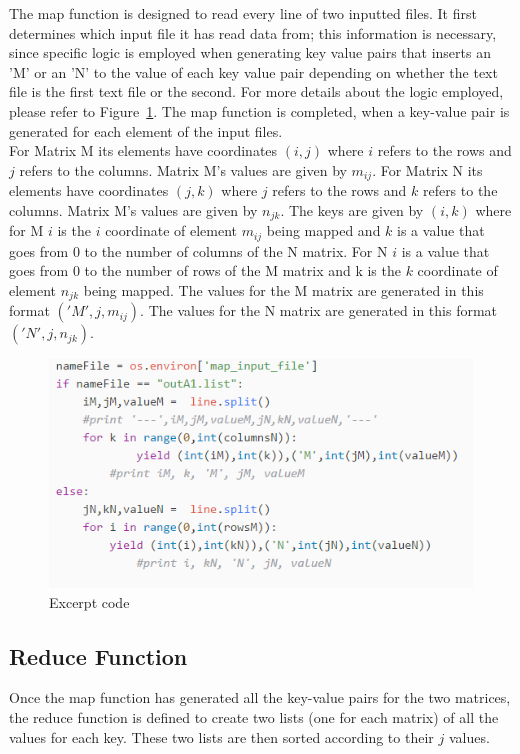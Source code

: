 \documentclass[journal, a4paper]{IEEEtran}
\begin{document}
The map function is designed to read every line of two inputted files. It first determines which input file it has read data from; this information is necessary, since specific logic is employed when generating key value pairs that inserts an 'M' or an 'N' to the value of each key value pair depending on whether the text file is the first text file or the second. For more details about the logic employed, please refer to Figure~\ref{code}. The map function is completed, when a key-value pair is generated for each element of the input files. \\

For Matrix M its elements have coordinates $(i,j)$ where $i$ refers to the rows and $j$ refers to the columns. Matrix M's values are given by $m_{ij}$. For Matrix N its elements have coordinates $(j,k)$ where $j$ refers to the rows and $k$ refers to the columns. Matrix M's values are given by $n_{jk}$. The keys are given by $(i,k)$ where for M $i$ is the $i$ coordinate of element $m_{ij}$ being mapped and $k$ is a value that goes from $0$ to the number of columns of the N matrix. For N $i$ is a value that goes from $0$ to the number of rows of the M matrix and k is the $k$ coordinate of element $n_{jk}$ being mapped. The values for the M matrix are generated in this format $('M' , j , m_{ij})$. The values for the N matrix are generated in this format $('N' , j , n_{jk})$.

	\begin{figure}[hbtp!]
		\centering
		\includegraphics[scale = 0.78]{code.png}
		\caption{Excerpt code}
		\label {code}
	\end{figure}


\subsection{Reduce Function}
\noindent
Once the map function has generated all the key-value pairs for the two matrices, the reduce function is defined to create two lists (one for each matrix) of all the values for each key. These two lists are then sorted according to their $j$ values.
 
\end{document}

